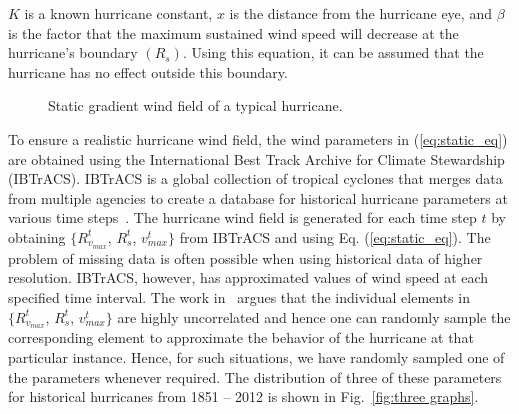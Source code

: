 \noindent
$K$ is a known hurricane constant, $x$ is the distance from the hurricane eye, and $\beta$ is the factor that the maximum sustained wind speed will decrease at the hurricane’s boundary $(R_s)$. Using this equation, it can be assumed that the hurricane has no effect outside this boundary.

\begin{figure}[t]
    \centering
    \caption{Static gradient wind field of a typical hurricane.}
    \label{fig:static_hurricane}
\end{figure}

To ensure a realistic hurricane wind field, the wind parameters in (\ref{eq:static_eq}) are obtained using the International Best Track Archive for Climate Stewardship (IBTrACS). IBTrACS is a global collection of tropical cyclones that merges data from multiple agencies to create a database for historical hurricane parameters at various time steps~\cite{Knapp2010}. The hurricane wind field is generated for each time step $t$ by obtaining $\{R_{v_{max}}^t$, $R_{s}^t$, $v_{max}^t\}$ from IBTrACS and using Eq. (\ref{eq:static_eq}). The problem of missing data is often possible when using historical data of higher resolution. IBTrACS, however, has approximated values of wind speed at each specified time interval. The work in~\cite{javanbakht2014risk} argues that the individual elements in $\{R_{v_{max}}^t$, $R_{s}^t$, $v_{max}^t\}$ are highly uncorrelated and hence one can randomly sample the corresponding element to approximate the behavior of the hurricane at that particular instance. Hence, for such situations, we have randomly sampled one of the parameters whenever required. The distribution of three of these parameters for historical hurricanes from 1851 -- 2012 is shown in Fig.~\ref{fig:three graphs}.       


